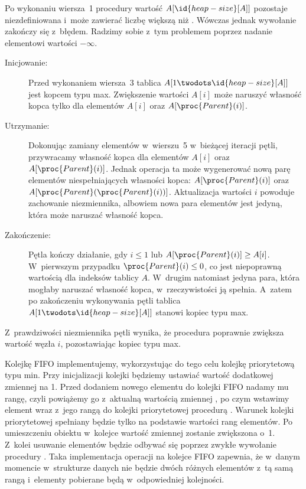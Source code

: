 \exercise %
Po wykonaniu wiersza~1 procedury  wartość $A[\id{heap-size}[A]]$ pozostaje niezdefiniowana i~może zawierać liczbę większą niż . Wówczas jednak wywołanie  zakończy się z~błędem. Radzimy sobie z~tym problemem poprzez nadanie elementowi wartości $-\infty$.

\exercise %
\begin{description}
	\item[Inicjowanie:] Przed wykonaniem wiersza~3 tablica $A[1\twodots\id{heap-size}[A]]$ jest kopcem typu max. Zwiększenie wartości $A[i]$ może naruszyć własność kopca tylko dla elementów $A[i]$ oraz $A[\proc{Parent}(i)]$.
	\item[Utrzymanie:] Dokonując zamiany elementów w~wierszu~5 w~bieżącej iteracji pętli, przywracamy własność kopca dla elementów $A[i]$ oraz $A[\proc{Parent}(i)]$. Jednak operacja ta może wygenerować nową parę elementów niespełniających własności kopca: $A[\proc{Parent}(i)]$ oraz $A[\proc{Parent}(\proc{Parent}(i))]$. Aktualizacja wartości $i$ powoduje zachowanie niezmiennika, albowiem nowa para elementów jest jedyną, która może naruszać własność kopca.
	\item[Zakończenie:] Pętla kończy działanie, gdy $i\le1$ lub $A[\proc{Parent}(i)]\ge A[i]$. W~pierwszym przypadku $\proc{Parent}(i)\le0$, co jest niepoprawną wartością dla indeksów tablicy $A$. W~drugim natomiast jedyna para, która mogłaby naruszać własność kopca, w~rzeczywistości ją spełnia. A~zatem po zakończeniu wykonywania pętli tablica $A[1\twodots\id{heap-size}[A]]$ stanowi kopiec typu max.
\end{description}
Z~prawdziwości niezmiennika pętli wynika, że procedura  poprawnie zwiększa wartość węzła $i$, pozostawiając kopiec typu max.

\exercise %
Kolejkę FIFO implementujemy, wykorzystując do tego celu kolejkę priorytetową typu min. Przy inicjalizacji kolejki będziemy ustawiać wartość dodatkowej zmiennej  na 1. Przed dodaniem nowego elementu do kolejki FIFO nadamy mu rangę, czyli powiążemy go z~aktualną wartością zmiennej , po czym wstawimy element wraz z~jego rangą do kolejki priorytetowej procedurą . Warunek kolejki priorytetowej spełniany będzie tylko na podstawie wartości rang elementów. Po umieszczeniu obiektu w~kolejce wartość zmiennej  zostanie zwiększona o~1. Z~kolei usuwanie elementów będzie odbywać się poprzez zwykłe wywołanie procedury . Taka implementacja operacji na kolejce FIFO zapewnia, że w~danym momencie w~strukturze danych nie będzie dwóch różnych elementów z~tą samą rangą i~elementy pobierane będą w~odpowiedniej kolejności.

